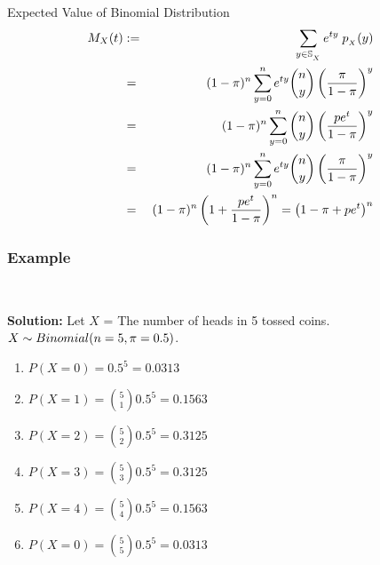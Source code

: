 \documentclass[compress]{beamer}
\begin{document}
\begin{frame}{Expected Value of Binomial Distribution}
\begin{eqnarray}
M_X(t)& := &  \sum_{y\in \support[X]} e^{ty}\; \pmf_{_X}(y) \nonumber\\
& =& (1-\binP)^{n}  \sum_{y=0}^{n}  e^{ty} {n\choose y}\left( \frac{\binP}{1-\binP}\right)^y   \nonumber\\
& =& (1-\binP)^{n}  \sum_{y=0}^{n}  {n\choose y}\left( \frac{pe^{t}}{1-\binP}\right)^y   \nonumber\\
& =& (1-\binP)^{n}  \sum_{y=0}^{n}  e^{ty} {n\choose y}\left( \frac{\binP}{1-\binP}\right)^y   \nonumber\\
& =& (1-\binP)^{n} \left( 1+  \frac{pe^t}{1-\binP} \right)^n = \left( 1-\binP+pe^t\right)^n  \nonumber\\
\end{eqnarray}



\end{frame}




\begin{frame}\frametitle{Example}
\vspace{-.1in}
\\
\pause
\vspace{.1in}
{\tiny 
{\bf Solution: }
Let $X$ = The number of heads in 5 tossed coins. $X\sim Binomial(n=5, \pi=0.5)$.
\begin{enumerate}
\item $P(X = 0) =0.5^5 = 0.0313$
\item $P(X = 1) ={5 \choose 1}0.5^5 =0.1563$
\item $P(X = 2) ={5 \choose 2}0.5^5 =0.3125$
\item $P(X = 3) ={5 \choose 3}0.5^5 =0.3125$
\item $P(X = 4) ={5 \choose 4}0.5^5 =0.1563$
\item $P(X = 0) ={5 \choose 5}0.5^5 = 0.0313$
\end{enumerate}
}
\end{frame}
\end{document}
